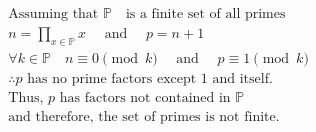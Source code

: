 $$
\begin{aligned}
&\text{Assuming that $\mathbb{P}$ }\text{ is a finite set of all primes} \\
&n = \prod_{x \in \mathbb{P}}^{} x \quad \text{ and } \quad p = n+1 \\
&\forall k  \in \mathbb{P} \quad n \equiv 0 \pmod{k} \quad \text{ and } \quad p \equiv 1 \pmod{k} \\
&\therefore p \text{ has no prime factors except 1 and itself.} \\
&\text{Thus, } p \text{ has factors not contained in } \mathbb{P} \\
&\text{and therefore, the set of primes is not finite.}
\end{aligned}
$$
